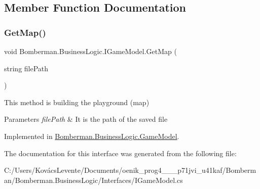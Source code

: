 \subsection{Member Function Documentation}
\mbox{\label{interface_bomberman_1_1_business_logic_1_1_i_game_model_ad00b9948871adc4b67dc0ef4ed6960ab}} 
\subsubsection{\texorpdfstring{GetMap()}{GetMap()}}
{\footnotesize\ttfamily void Bomberman.\+Business\+Logic.\+I\+Game\+Model.\+Get\+Map (\begin{DoxyParamCaption}\item[{string}]{file\+Path }\end{DoxyParamCaption})}



This method is building the playground (map) 


\begin{DoxyParams}{Parameters}
{\em file\+Path} & It is the path of the saved file\\
\hline
\end{DoxyParams}


Implemented in \mbox{\hyperlink{class_bomberman_1_1_business_logic_1_1_game_model_acadffe349bcbe6f81eca43d7f57b2763}{Bomberman.\+Business\+Logic.\+Game\+Model}}.



The documentation for this interface was generated from the following file\+:\begin{DoxyCompactItemize}
\item 
C\+:/\+Users/\+Kovács\+Levente/\+Documents/oenik\+\_\+prog4\+\_\+\_\+\_\+p71jvi\+\_\+u41kaf/\+Bomberman/\+Bomberman.\+Business\+Logic/\+Interfaces/I\+Game\+Model.\+cs\end{DoxyCompactItemize}
